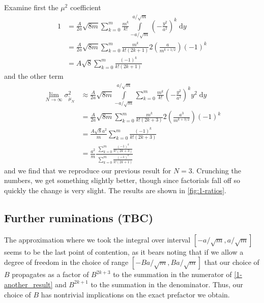 \documentclass[12pt]{report}
\begin{document}
Examine first the $\mu^2$ coefficient
\begin{align}
    1
        &= \frac{A}{2a}\sqrt{8m}
            \sum\limits_{k=0}^{m}\frac{m^k}{k!}
                \int\limits_{-a/\sqrt{m}}^{a/\sqrt{m}}
                    \left( -\frac{y^2}{a^2} \right)^k
                \;\mathrm{d}y\\
        &= \frac{A}{2a}\sqrt{8m}
            \sum\limits_{k=0}^{m}\frac{m^k}{k!(2k+1)}
                2\left( \frac{a}{m^{k + 1/2}} \right)\left( -1 \right)^{k}\\
        &= A\sqrt{8}\sum\limits_{k=0}^{m}\frac{\left( -1 \right)^{k}}{k!(2k+1)}
\end{align}
and the other term
\begin{align}
    \lim_{N \to \infty}\sigma_{\tilde{\mu}_N}^2
        &\approx \frac{A}{2a}\sqrt{8m}
            \int\limits_{-a/\sqrt{m}}^{a/\sqrt{m}}
                \sum\limits_{k=0}^{m}\frac{m^k}{k!}
                    \left( -\frac{y^2}{a^2} \right)^k
                y^2
            \;\mathrm{d}y\\
        &= \frac{A}{2a}\sqrt{8m}
            \sum\limits_{k=0}^{m}\frac{m^k}{k!(2k+3)}
                2\left( \frac{a^3}{m^{k + 3/2}} \right)\left( -1 \right)^{k}\\
        &= \frac{A\sqrt{8}a^2}{m}\sum\limits_{k=0}^{m}
            \frac{\left( -1 \right)^{k}}{k!(2k+3)}\\
        &= \frac{a^2}{m}\frac{\
                \sum\limits_{k=0}^{m}\frac{\left( -1 \right)^k}{k!(2k+3)}
            }{\
                \sum\limits_{k=0}^{m}\frac{\left( -1 \right)^k}{k!(2k+1)}
            }\label{1-another_result}
\end{align}
and we find that we reproduce our previous result for $N=3$. Crunching the
numbers, we get something slightly better, though since factorials fall off so
quickly the change is very slight. The results are shown in
\autoref{fig:1-ratios}.

\subsection{Further ruminations (TBC)}

The approximation where we took the integral over interval $[-a/\sqrt{m},
a/\sqrt{m}]$ seems to be the last point of contention, as it bears noting that
if we allow a degree of freedom in the choice of range $\left[
    -Ba/\sqrt{m}, Ba/\sqrt{m}
\right]$ that our choice of $B$ propagates as a factor of $B^{2k+3}$ to the
summation in the numerator of \autoref{1-another_result} and $B^{2k+1}$ to the
summation in the denominator. Thus, our choice of $B$ has nontrivial
implications on the exact prefactor we obtain.
\end{document}
